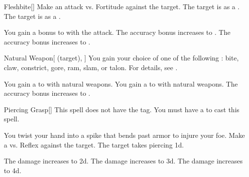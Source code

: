 \lowercase{\hypertarget{spell:Fleshbite}{}}\label{spell:Fleshbite}
\begin{freeability}[Rank 1]{\hypertarget{spell:Fleshbite}{Fleshbite}}[]
Make an attack vs. Fortitude against the target.
\hit The target is  as a .
\crit The target is  as a .

\rankline
{} You gain a  bonus to  with the attack.
 The accuracy bonus increases to .
 The accuracy bonus increases to .
\end{freeability}
\vspace{0.25em}



\lowercase{\hypertarget{spell:Natural Weapon}{}}\label{spell:Natural Weapon}
\begin{attuneability}[Rank 1]{\hypertarget{spell:Natural Weapon}{Natural Weapon}}[ (target), ]
You gain your choice of one of the following : bite, claw, constrict, gore, ram, slam, or talon.
For details, see .

\rankline
{} You gain a   to  with natural weapons.
 You gain a   to  with natural weapons.
 The accuracy bonus increases to .
\end{attuneability}
\vspace{0.25em}



\lowercase{\hypertarget{spell:Piercing Grasp}{}}\label{spell:Piercing Grasp}
\begin{freeability}[Rank 1]{\hypertarget{spell:Piercing Grasp}{Piercing Grasp}}[]
This spell does not have the  tag.
You must have a  to cast this spell.

You twist your hand into a spike that bends past armor to injure your foe.
Make a  vs. Reflex against the target.
\hit The target takes piercing  \plus1d.

\rankline
{} The damage increases to  \plus2d.
 The damage increases to  \plus3d.
 The damage increases to  \plus4d.
\end{freeability}
\vspace{0.25em}



